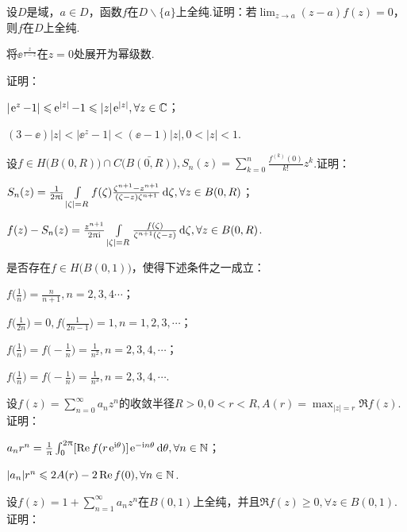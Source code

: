 \begin{xiti}
  \item 设$D$是域，$a\in D$，函数$f$在$D\backslash\{a\}$上全纯.证明：若$\lim_{z\to a}(z-a)f(z)=0$，则$f$在$D$上全纯.
  \item 将$\ee^{\frac z{1-z}}$在$z=0$处展开为幂级数.
  \item 证明：
    \begin{enuma}
      \item $|\operatorname{\!\!\;\mathrm e}^z-1|\leqslant\operatorname{\!\!\;\mathrm e}^{|z|}-1\leqslant|z|\operatorname{\!\!\;\mathrm e}^{|z|},\forall z\in \mathbb C$；
      \item $(3-\ee)|z|<|\ee^z-1|<(\ee-1)|z|,0<|z|<1$.
    \end{enuma}
  \item 设$f\in H\big(B(0,R)\big)\cap C\big(\bar{B(0,R)}\big),S_n(z)=\sum_{k=0}^n
      \frac{f^{(k)}(0)}{k!}z^k$.证明：
    \begin{enuma}
      \item $S_n(z)=\frac1{2\uppi\mathrm i}\int\limits_{|\zeta|=R}f(\zeta)\frac{\zeta^{n+1}-z^{n+1}}
      {(\zeta-z)\zeta^{n+1}}\mathop{}\!\mathrm{d} \zeta,\forall z\in B(0,R)$；
      \item $f(z)-S_n(z)=\frac{z^{n+1}}{2\uppi\mathrm i}\int\limits_{|\zeta|=R}
        \frac{f(\zeta)}{\zeta^{n+1}(\zeta-z)}\mathop{}\!\mathrm{d} \zeta,\forall z\in B(0,R)$.
    \end{enuma}
  \item 是否存在$f\in H\big(B(0,1)\big)$，使得下述条件之一成立：
    \begin{enuma}
      \item $f\bigg(\frac1n\bigg)=\frac n{n+1},n=2,3,4\cdots$；
      \item $f\bigg(\frac1{2n}\bigg)=0,f\bigg(\frac1{2n-1}\bigg)=1,n=1,2,3,\cdots$；
      \item $f\bigg(\frac1n\bigg)=f\bigg(-\frac1n\bigg)=\frac1{n^2},n=2,3,4,\cdots$；
      \item $f\bigg(\frac1n\bigg)=f\bigg(-\frac1n\bigg)=\frac1{n^3},n=2,3,4,\cdots$.
    \end{enuma}
  \item 设$f(z)=\sum_{n=0}^\infty a_nz^n$的收敛半径$R>0,0<r<R,A(r)=\max_{|z|=r}
      \Re f(z)$. 证明：
    \begin{enuma}
      \item $a_nr^n=\frac1{\uppi}\int_0^{2\uppi}[\operatorname{Re} f(r\operatorname{\!\!\;\mathrm e}^{\mathrm i\theta})]\operatorname{\!\!\;\mathrm e}^{-\mathrm i n\theta}\mathop{}\!\mathrm{d} \theta,\forall n\in \mathbb N$；
      \item $|a_n|r^n\leqslant 2A(r)-2\operatorname{Re} f(0),\forall n\in \mathbb N$.
    \end{enuma}
  \item 设$f(z)=1+\sum_{n=1}^\infty a_nz^n$在$B(0,1)$上全纯，并且$\Re f(z)\ge0,\forall z\in B(0,1)$.证明：

\end{xiti}
